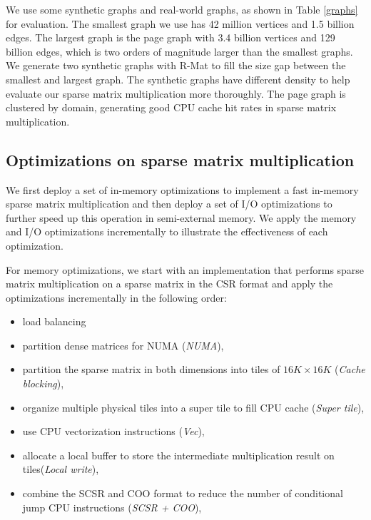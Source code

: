 We use some synthetic graphs and real-world graphs, as shown in Table \ref{graphs}
for evaluation. The smallest graph we use has 42 million vertices and 1.5 billion
edges. The largest graph is the page graph with 3.4 billion vertices
and 129 billion edges, which is two orders of magnitude larger than the smallest
graphs. We generate two synthetic graphs with R-Mat \cite{rmat} to fill
the size gap between the smallest and largest graph. The synthetic graphs
have different density to help evaluate our sparse matrix multiplication more
thoroughly. The page graph is clustered by domain, generating good CPU cache
hit rates in sparse matrix multiplication.

\subsection{Optimizations on sparse matrix multiplication}
We first deploy a set of in-memory optimizations to implement a fast
in-memory sparse matrix multiplication and then deploy a set of I/O
optimizations to further speed up this operation in semi-external memory.
We apply the memory and I/O optimizations incrementally to illustrate
the effectiveness of each optimization.

For memory optimizations, we start with an implementation that performs sparse
matrix multiplication on a sparse matrix in the CSR format and apply
the optimizations incrementally in the following order:
\begin{itemize} \itemsep1pt \parskip0pt 
	\item load balancing 
	\item partition dense matrices for NUMA (\textit{NUMA}),
	\item partition the sparse matrix in both dimensions into tiles of
		$16K \times 16K$ (\textit{Cache blocking}),
	\item organize multiple physical tiles into a super tile to fill CPU cache
		(\textit{Super tile}),
	\item use CPU vectorization instructions (\textit{Vec}),
	\item allocate a local buffer to store the intermediate multiplication
		result on tiles(\textit{Local write}),
	\item combine the SCSR and COO format to reduce the number of conditional
		jump CPU instructions (\textit{SCSR + COO}),
\end{itemize}

